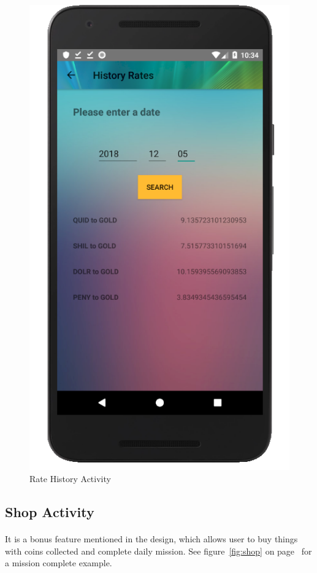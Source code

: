 \documentclass[12pt]{article}
\begin{document}
\begin{figure}
	\includegraphics[scale=0.25]{HistoryRateSearch.png}
	\caption{\label{fig:rateHistory}Rate History Activity}
\end{figure}

\subsection{\color{orange}Shop Activity}
\paragraph{}
It is a bonus feature mentioned in the design, which allows user to buy things with coins collected and complete daily mission. See figure~\ref{fig:shop} on page~\pageref{fig:shop} for a mission complete example.
\end{document}
